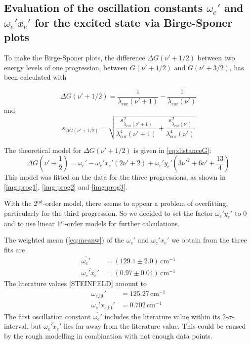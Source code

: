 

\subsection{Evaluation of the oscillation constants $\omega_e'$ and $\omega_e' x_e'$ for the excited state
via Birge-Sponer plots}
To make the Birge-Sponer plots,
the difference $\Delta G(\nu' +1/2)$ between two energy levels of one progression,
between $G(\nu' +1/2)$ and  $G(\nu' +3/2)$,
has been calculated with

\begin{equation}
  \Delta G(\nu' +1/2)=\frac{1}{\lambda_{\text{cor}}(\nu'+1)}-\frac{1}{\lambda_{\text{cor}}(\nu')}
\end{equation}
and
\begin{equation}
  s_{\Delta G(\nu' +1/2)}=
  \sqrt{\frac{s^2_{\lambda_{\text{cor}}(\nu'+1)}}{\lambda^4_{\text{cor}}(\nu'+1)}+
  \frac{s^2_{\lambda_{\text{cor}}(\nu')}}{\lambda^4_{\text{cor}}(\nu')}}
\end{equation}

The theoretical model for $\Delta G(\nu' +1/2)$ is given in \autoref{eq:distanceG}:
\begin{equation}
  \Delta G(\nu' + \frac{1}{2})=\omega_e' - \omega_e' x_e'(2\nu'+2) + \omega_e' y_e'(3\nu'^2 + 6 \nu' +\frac{13}{4})
\end{equation}
This model was fitted on the data for the three progressions, as shown in \autoref{img:prog1},
\autoref{img:prog2} and \autoref{img:prog3}.

With the 2$^\text{nd}$-order model, there seems to appear a problem of overfitting,
particularly for the third progression.
So we decided to set the factor $\omega_e' y_e'$ to 0 and to use linear 1$^\text{st}$-order models
for further calculations.

The weighted mean (\autoref{eq:meanw}) of the $\omega_e'$ and $\omega_e' x_e'$ we obtain from the three fits are
\begin{equation}
\begin{split}
    \overline{\omega_e'}		&   = (129.1 \pm 2.0)\,\text{cm}^{-1}\\
    \overline{\omega_e' x_e'} 	&	= (0.97 \pm 0.04)\,\text{cm}^{-1}
  \end{split}
\end{equation}
The literature values [STEINFELD] amount to %
\begin{equation}
\begin{split}
    \omega_{e\text{,lit}}'			&   = 125.27\,\text{cm}^{-1}\\
    \omega_e' x_{e\text{,lit}}' 	&	= 0.702\,\text{cm}^{-1}
  \end{split}
\end{equation}
The first oscillation constant $\overline{\omega_e'}$ includes the literature value within its 2-$\sigma$-interval, but
$\overline{\omega_e' x_e'}$ lies far away from the literature value. This could be caused by the rough
modelling in combination with not enough data points.



